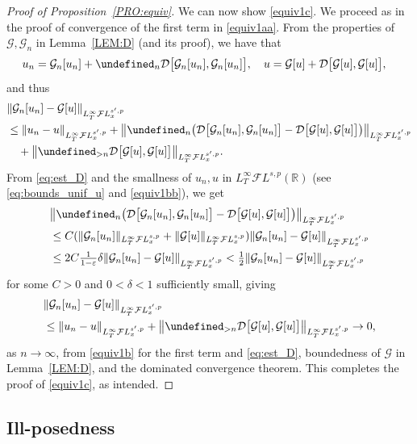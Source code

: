 \documentclass[a4paper,
11pt,  reqno]{amsart}
\newcommand{\5}{\textup{V}}
\newcommand{\FL}{\mathcal{F} L}
\newcommand{\dl}{\delta}
\newcommand{\eps}{\varepsilon}
\theoremstyle{remark}
\newcommand{\R}{\mathbb{R}}
\let\P= \undefined
\newcommand{\P}{\mathbf{P}}
\newcommand{\Gc}{\mathcal{G}}
\numberwithin{equation}{section}
\numberwithin{theorem}{section}
\newcommand{\DD}{\mathcal{D}}
\begin{document}
\begin{proof}[Proof of Proposition~\ref{PRO:equiv}]
We can now show \eqref{equiv1c}. We proceed as in the proof of convergence of the first term in \eqref{equiv1aa}. From the properties of $\Gc, \Gc_n$ in Lemma~\ref{LEM:D} (and its proof), we have that
\begin{align}
u_n &= \Gc_n[u_n] + \P_n \DD\big[ \Gc_n[u_n], \Gc_n[u_n]\big],
\quad
u = \Gc[u] +  \DD\big[ \Gc[u], \Gc[u]\big],
\end{align}
and thus
\begin{align}
&\| \Gc_n[u_n] - \Gc[u] \|_{L^\infty_T \FL^{s',p}_x}
\\
&
\le \| u_n - u \|_{L^\infty_T \FL^{s',p}_x}
+
\big\| \P_n \big(  \DD\big[ \Gc_n[u_n], \Gc_n[u_n]\big] -  \DD\big[ \Gc[u], \Gc[u]\big]  \big) \big\|_{L^\infty_T \FL^{s',p}_x}
\\
&
\quad
+
\big\| \P_{>n} \DD\big[ \Gc[u], \Gc[u]\big] \big\|_{L^\infty_T \FL^{s',p}_x}.
\end{align}
From \eqref{eq:est_D} and the smallness of $u_n,u$ in $L^\infty_T\FL^{s,p}(\R)$ (see \eqref{eq:bounds_unif_u} and
\eqref{equiv1bb}), we get
\begin{align}
&
\big\| \P_n \big(  \DD\big[ \Gc_n[u_n], \Gc_n[u_n]\big] -  \DD\big[ \Gc[u], \Gc[u]\big]  \big) \big\|_{L^\infty_T \FL^{s',p}_x}
\\
&
\le C (\| \Gc_n[u_n] \|_{L^\infty_T \FL^{s,p}_x} + \| \Gc[u] \|_{L^\infty_T \FL^{s,p}_x}) \| \Gc_n[u_n] - \Gc[u] \|_{L^\infty_T \FL^{s',p}_x}
\\
&
\le 2C \tfrac{1}{1-\eps} \dl  \| \Gc_n[u_n] - \Gc[u] \|_{L^\infty_T \FL^{s',p}_x} < \tfrac12  \| \Gc_n[u_n] - \Gc[u] \|_{L^\infty_T \FL^{s',p}_x}
\end{align}
for some $C>0$ and $0<\dl<1$ sufficiently small, giving
\begin{align}
&\| \Gc_n[u_n] - \Gc[u] \|_{L^\infty_T \FL^{s',p}_x}
\\
&
\le \|u_n-u \|_{L^\infty_T \FL^{s',p}_x} +
\big\| \P_{>n} \DD\big[ \Gc[u], \Gc[u]\big] \big\|_{L^\infty_T \FL^{s',p}_x}
\to 0,
\end{align}
as $n\to\infty$, from \eqref{equiv1b} for the first term and \eqref{eq:est_D}, boundedness of $\Gc$ in Lemma~\ref{LEM:D}, and the dominated convergence theorem.
This completes the proof of
\eqref{equiv1c}, as intended. \qedhere

\end{proof}




\subsection{Ill-posedness}
\label{SUBSEC:ill}
\end{document}
